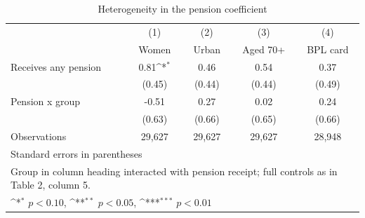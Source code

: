 \begin{table}[htbp]\centering
\def\sym#1{\ifmmode^{#1}\else\(^{#1}\)\fi}
\caption{Heterogeneity in the pension coefficient\label{tab:het}}
\begin{tabular}{l*{4}{c}}
\toprule
                    &\multicolumn{1}{c}{(1)}&\multicolumn{1}{c}{(2)}&\multicolumn{1}{c}{(3)}&\multicolumn{1}{c}{(4)}\\
                    &\multicolumn{1}{c}{Women}&\multicolumn{1}{c}{Urban}&\multicolumn{1}{c}{Aged 70+}&\multicolumn{1}{c}{BPL card}\\
\midrule
Receives any pension&        0.81\sym{*}  &        0.46         &        0.54         &        0.37         \\
                    &      (0.45)         &      (0.44)         &      (0.44)         &      (0.49)         \\
\addlinespace
Pension x group     &       -0.51         &        0.27         &        0.02         &        0.24         \\
                    &      (0.63)         &      (0.66)         &      (0.65)         &      (0.66)         \\
\midrule
Observations        &      29,627         &      29,627         &      29,627         &      28,948         \\
\bottomrule
\multicolumn{5}{l}{\footnotesize Standard errors in parentheses}\\
\multicolumn{5}{l}{\footnotesize Group in column heading interacted with pension receipt; full controls as in Table 2, column 5.}\\
\multicolumn{5}{l}{\footnotesize \sym{*} \(p<0.10\), \sym{**} \(p<0.05\), \sym{***} \(p<0.01\)}\\
\end{tabular}
\end{table}
